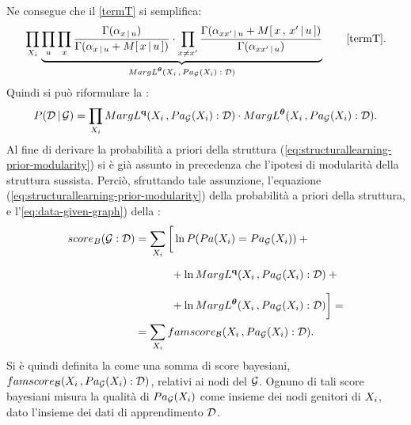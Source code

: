 Ne consegue che il \autoref{termT} si semplifica:
\[
\prod_{\setel{X}_i} \underbrace{\prod_{\setel{u}} \prod_{\setel{x}} \frac{\Gamma(\alpha_{\setel{x}\,\arrowvert\,\setel{u}})}{\Gamma(\alpha_{\setel{x}\,\arrowvert\,\setel{u}}+\mstat{x\,\arrowvert\,\setel{u}})} \cdot \prod_{\setel{x}\neq\setel{x}^\prime} \frac{\Gamma(\alpha_{\setel{x}\setel{x}^\prime\,\arrowvert\,\setel{u}}+\mstat[x]{\setel{x}^\prime\,\arrowvert\,\setel{u}})}{\Gamma(\alpha_{\setel{x}\setel{x}^\prime\,\arrowvert\,\setel{u}})}}_\text{$MargL^{\param{$\theta$}}(\setel{X}_i\,,Pa_{\conceptsym{G}}(\setel{X}_i):\conceptsym{D})$} \tag*{\ref{termT}} \text{.}
\]
Quindi si può riformulare la :
\begin{equation}\label{eq:data-given-graph}
P(\mathcal{D}\,\arrowvert\,\mathcal{G}) = \prod_{\mathnormal{X}_i} MargL^{\boldsymbol{\textbf{\text{q}}}}(\mathnormal{X}_i\,,Pa_{\mathcal{G}}(\mathnormal{X}_i):\mathcal{D}) \cdot MargL^{\boldsymbol{\textbf{\text{$\theta$}}}}(\mathnormal{X}_i\,,Pa_{\mathcal{G}}(\mathnormal{X}_i):\mathcal{D}) \text{.}
\end{equation}
Al fine di derivare la probabilità a priori della struttura (\autoref{eq:structurallearning-prior-modularity}) si è già assunto in precedenza che l'ipotesi di modularità della struttura sussista. Perciò, sfruttando tale assunzione, l'equazione (\ref{eq:structurallearning-prior-modularity}) della probabilità a priori della struttura, e l'\autoref{eq:data-given-graph}) della :
\begin{align}\label{eq:bayesian-score}
score_B(\mathcal{G}:\mathcal{D}) &= \sum_{\mathnormal{X}_i} \bigg[ \ln{P(Pa(\mathnormal{X}_i)=Pa_{\mathcal{G}}(\mathnormal{X}_i))} + \bigg.\nonumber\\
& \qquad \quad \> \bigg.{} + \ln{MargL^{\boldsymbol{\textbf{\text{q}}}}(\mathnormal{X}_i\,,Pa_{\mathcal{G}}(\mathnormal{X}_i):\mathcal{D})} + \bigg.\nonumber\\
& \qquad \quad \> \bigg.{} + \ln{MargL^{\boldsymbol{\textbf{\text{$\theta$}}}}(\mathnormal{X}_i\,,Pa_{\mathcal{G}}(\mathnormal{X}_i):\mathcal{D})} \bigg] = \nonumber\\
&= \sum_{\mathnormal{X}_i} famscore_{\mathcal{B}}(\mathnormal{X}_i\,,Pa_{\mathcal{G}}(\mathnormal{X}_i):\mathcal{D}) \text{.}
\end{align}
Si è quindi definita la  come una somma di score bayesiani, $famscore_{\mathcal{B}}(\mathnormal{X}_i\,,Pa_{\mathcal{G}}(\mathnormal{X}_i):\mathcal{D})$, relativi ai nodi del  $\mathcal{G}$. Ognuno di tali score bayesiani misura la qualità di $Pa_{\mathcal{G}}(\mathnormal{X}_i)$ come insieme dei nodi genitori di $\mathnormal{X}_i$, dato l'insieme dei dati di apprendimento $\mathcal{D}$.

